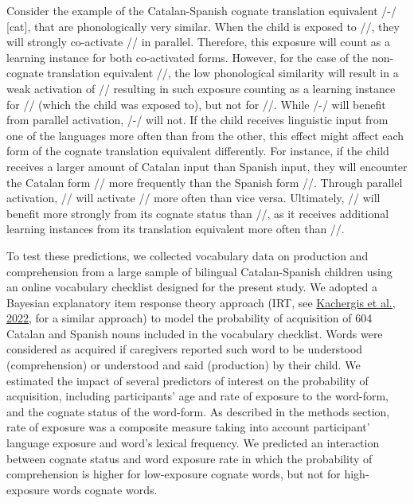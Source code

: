 \documentclass[
]{article}
\begin{document}
Consider the example of the Catalan-Spanish cognate translation
equivalent /-/ {[}cat{]}, that are
phonologically very similar. When the child is exposed to
//, they will strongly co-activate // in
parallel. Therefore, this exposure will count as a learning instance for
both co-activated forms. However, for the case of the non-cognate
translation equivalent //, the low phonological similarity
will result in a weak activation of // resulting in such
exposure counting as a learning instance for // (which the
child was exposed to), but not for //. While
/-/ will benefit from parallel activation,
/-/ will not. If the child receives
linguistic input from one of the languages more often than from the
other, this effect might affect each form of the cognate translation
equivalent differently. For instance, if the child receives a larger
amount of Catalan input than Spanish input, they will encounter the
Catalan form // more frequently than the Spanish form
//. Through parallel activation, // will
activate // more often than vice versa. Ultimately,
// will benefit more strongly from its cognate status
than //, as it receives additional learning instances from
its translation equivalent more often than //.

To test these predictions, we collected vocabulary data on production
and comprehension from a large sample of bilingual Catalan-Spanish
children using an online vocabulary checklist designed for the present
study. We adopted a Bayesian explanatory item response theory approach
(IRT, see \protect\hyperlink{ref-kachergis2022standard}{Kachergis et
al., 2022}, for a similar approach) to model the probability of
acquisition of 604 Catalan and Spanish nouns included in the vocabulary
checklist. Words were considered as acquired if caregivers reported such
word to be understood (comprehension) or understood and said
(production) by their child. We estimated the impact of several
predictors of interest on the probability of acquisition, including
participants' age and rate of exposure to the word-form, and the cognate
status of the word-form. As described in the methods section, rate of
exposure was a composite measure taking into account participant'
language exposure and word's lexical frequency. We predicted an
interaction between cognate status and word exposure rate in which the
probability of comprehension is higher for low-exposure cognate words,
but not for high-exposure words cognate words.
\end{document}
